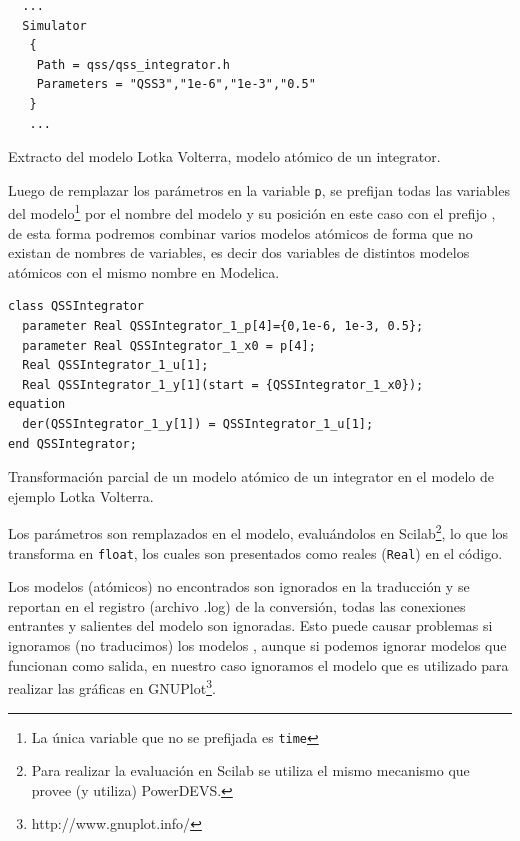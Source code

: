 \begin{listing}[H]
\begin{verbatim}
  ...
  Simulator
   {
    Path = qss/qss_integrator.h
    Parameters = "QSS3","1e-6","1e-3","0.5"
   }
   ...
\end{verbatim}
\caption{Extracto del modelo Lotka Volterra, modelo atómico de un integrator.}\label{lst:qssint.pds}
\end{listing}

        Luego de remplazar los parámetros en la variable \texttt{p}, se prefijan todas las variables del modelo\footnote{La única variable que no se prefijada 
        es \texttt{time}} por el nombre del modelo y su posición en este caso con el prefijo 
        , de esta forma podremos combinar varios modelos atómicos de forma que no existan  de nombres de variables,
        es decir dos variables de distintos modelos atómicos con el mismo nombre en Modelica. 

\begin{listing}[H]
\begin{verbatim}
class QSSIntegrator
  parameter Real QSSIntegrator_1_p[4]={0,1e-6, 1e-3, 0.5};
  parameter Real QSSIntegrator_1_x0 = p[4];
  Real QSSIntegrator_1_u[1];
  Real QSSIntegrator_1_y[1](start = {QSSIntegrator_1_x0});
equation
  der(QSSIntegrator_1_y[1]) = QSSIntegrator_1_u[1];
end QSSIntegrator;
\end{verbatim}
\caption{Transformación parcial de un modelo atómico de un integrator en el modelo de ejemplo Lotka Volterra.}\label{lst:integradorparametros}
\end{listing}

        Los parámetros son remplazados en el modelo, evaluándolos en Scilab\footnote{Para realizar la evaluación en Scilab se utiliza el mismo mecanismo que 
        provee (y utiliza) PowerDEVS.}, lo que los transforma en \texttt{float}, los cuales son presentados como reales (\texttt{Real}) en el código.

        Los modelos (atómicos) no encontrados son ignorados en la traducción y se reportan en el registro (archivo .log) de la conversión, todas
	las conexiones entrantes y salientes del modelo son ignoradas. Esto puede causar problemas si ignoramos (no traducimos) los modelos ,
	aunque si podemos ignorar modelos que funcionan como salida, en nuestro caso ignoramos el modelo que es utilizado para realizar las gráficas
	en GNUPlot\footnote{http://www.gnuplot.info/}.

